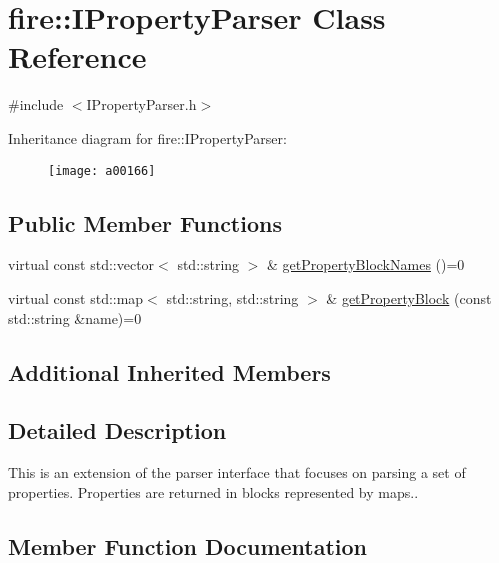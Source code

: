 \hypertarget{a00166}{}\section{fire\+:\+:I\+Property\+Parser Class Reference}
\label{a00166}


{\ttfamily \#include $<$I\+Property\+Parser.\+h$>$}

Inheritance diagram for fire\+:\+:I\+Property\+Parser\+:\begin{figure}[H]
\begin{center}
\leavevmode
\texttt{[image: a00166]}
\end{center}
\end{figure}
\subsection*{Public Member Functions}
\begin{DoxyCompactItemize}
\item 
virtual const std\+::vector$<$ std\+::string $>$ \& \hyperlink{a00166_a34602687f9d1affac7bd842102d4a6aa}{get\+Property\+Block\+Names} ()=0
\item 
virtual const std\+::map$<$ std\+::string, std\+::string $>$ \& \hyperlink{a00166_a34201371cb36dd09e96a66242ececb86}{get\+Property\+Block} (const std\+::string \&name)=0
\end{DoxyCompactItemize}
\subsection*{Additional Inherited Members}


\subsection{Detailed Description}
This is an extension of the parser interface that focuses on parsing a set of properties. Properties are returned in blocks represented by maps.. 

\subsection{Member Function Documentation}
